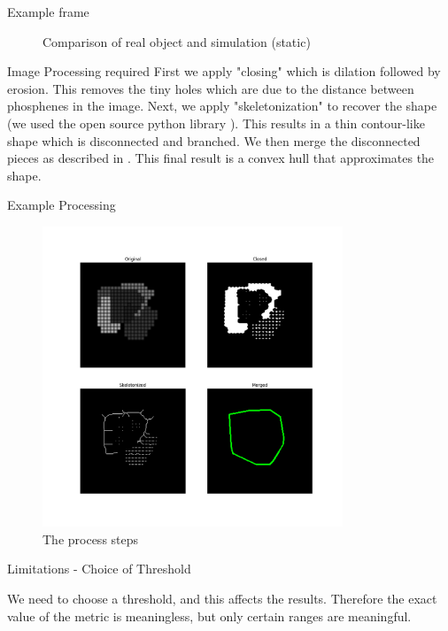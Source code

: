\documentclass[]{beamer}
\theoremstyle{remark}
\begin{document}
\begin{frame}{Example frame}
\begin{figure}[h]
	\caption{Comparison of real object and simulation (static)}
	\label{fig:image_comparison}
\end{figure}
\end{frame}

\begin{frame}{Image Processing required}
	First we apply "closing" which is dilation followed by erosion. This removes the tiny holes which are due to the distance between phosphenes in the image. Next, we apply "skeletonization" to recover the shape (we used the open source python library \cite{scikit-image}). This results in a thin contour-like shape which is disconnected and branched. We then merge the disconnected pieces as described in \cite{stackoverflow}. This final result is a convex hull that approximates the shape.
\end{frame}

\begin{frame}{Example Processing}
\begin{figure}[h] %
	\centering
	\includegraphics[width=0.8\textwidth]{compare_pipeline.png}
	\caption{The process steps}
	\label{fig:example_image}
\end{figure}
\end{frame}

\begin{frame}{Limitations - Choice of Threshold}
	
We need to choose a threshold, and this affects the results. Therefore the exact value of the metric is meaningless, but only certain ranges are meaningful.
\end{frame}
\end{document}
